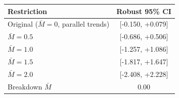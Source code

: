 \begin{tabular}{lc}
\toprule
Restriction & Robust 95\% CI \\
\midrule
Original ($\bar{M}=0$, parallel trends) & [-0.150, +0.079] \\
$\bar{M}=0.5$ & [-0.686, +0.506] \\
$\bar{M}=1.0$ & [-1.257, +1.086] \\
$\bar{M}=1.5$ & [-1.817, +1.647] \\
$\bar{M}=2.0$ & [-2.408, +2.228] \\
\midrule
Breakdown $\bar{M}$ & 0.00 \\
\bottomrule
\end{tabular}
